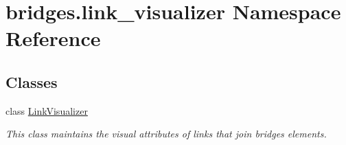 \hypertarget{namespacebridges_1_1link__visualizer}{}\section{bridges.\+link\+\_\+visualizer Namespace Reference}
\label{namespacebridges_1_1link__visualizer}
\subsection*{Classes}
\begin{DoxyCompactItemize}
\item 
class \mbox{\hyperlink{classbridges_1_1link__visualizer_1_1_link_visualizer}{Link\+Visualizer}}
\begin{DoxyCompactList}\small\item\em This class maintains the visual attributes of links that join bridges elements. \end{DoxyCompactList}\end{DoxyCompactItemize}
